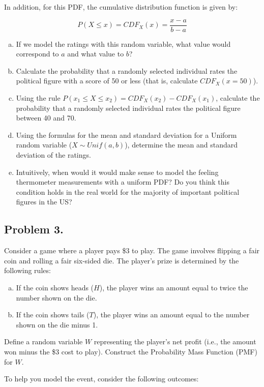 \documentclass{article}
\begin{document}
In addition, for this PDF, the cumulative distribution function is given by:

\[P(X\leq x) = CDF_X(x) = \frac{x-a}{b-a}\]

\begin{enumerate}[a)]
\item If we model the ratings with this random variable, what value would correspond to \(a\) and what value to \(b\)?
\item Calculate the probability that a randomly selected individual rates the political figure with a score of 50 or less (that is, calculate \(CDF_X(x=50)\)).
\item Using the rule \(P(x_1 \leq X \leq x_2) = CDF_X(x_2) - CDF_X(x_1)\), calculate the probability that a randomly selected individual rates the political figure between 40 and 70.
\item Using the formulas for the mean and standard deviation for a Uniform random variable (\(X\sim Unif(a,b)\)), determine the mean and standard deviation of the ratings.
\item Intuitively, when would it would make sense to model the feeling thermometer measurements with a uniform PDF? Do you think this condition holds in the real world for the majority of important political figures in the US?
\end{enumerate}

\subsection*{Problem 3.}

Consider a game where a player pays \$3 to play. The game involves flipping a fair coin and rolling a fair six-sided die. The player's prize is determined by the following rules:

\begin{enumerate}[a)]
\item If the coin shows heads (\(H\)), the player wins an amount equal to twice the number shown on the die.
\item If the coin shows tails (\(T\)), the player wins an amount equal to the number shown on the die minus 1.
\end{enumerate}

Define a random variable \(W\) representing the player's net profit (i.e., the amount won minus the \$3 cost to play). Construct the Probability Mass Function (PMF) for \(W\).

To help you model the event, consider the following outcomes:
\end{document}
